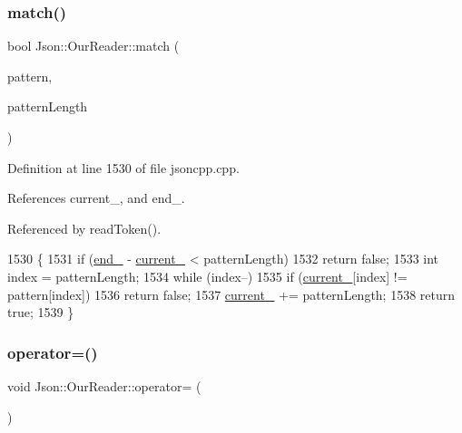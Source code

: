 \subsubsection{\texorpdfstring{match()}{match()}}
{\footnotesize\ttfamily bool Json\+::\+Our\+Reader\+::match (\begin{DoxyParamCaption}\item[{\hyperlink{class_json_1_1_our_reader_a1bdc7bbc52ba87cae6b19746f2ee0189}{Location}}]{pattern,  }\item[{int}]{pattern\+Length }\end{DoxyParamCaption})\hspace{0.3cm}{\ttfamily [private]}}



Definition at line 1530 of file jsoncpp.\+cpp.



References current\+\_\+, and end\+\_\+.



Referenced by read\+Token().


\begin{DoxyCode}
1530                                                          \{
1531   \textcolor{keywordflow}{if} (\hyperlink{class_json_1_1_our_reader_ab1f69b0260c27a0d2d65dc56e42c8f9d}{end\_} - \hyperlink{class_json_1_1_our_reader_a5211fbbba94be80a22dd2317c621efcc}{current\_} < patternLength)
1532     \textcolor{keywordflow}{return} \textcolor{keyword}{false};
1533   \textcolor{keywordtype}{int} index = patternLength;
1534   \textcolor{keywordflow}{while} (index--)
1535     \textcolor{keywordflow}{if} (\hyperlink{class_json_1_1_our_reader_a5211fbbba94be80a22dd2317c621efcc}{current\_}[index] != pattern[index])
1536       \textcolor{keywordflow}{return} \textcolor{keyword}{false};
1537   \hyperlink{class_json_1_1_our_reader_a5211fbbba94be80a22dd2317c621efcc}{current\_} += patternLength;
1538   \textcolor{keywordflow}{return} \textcolor{keyword}{true};
1539 \}
\end{DoxyCode}
\mbox{\label{class_json_1_1_our_reader_ad418de7c47bd3d0510888e22110b796e}} 
\subsubsection{\texorpdfstring{operator=()}{operator=()}}
{\footnotesize\ttfamily void Json\+::\+Our\+Reader\+::operator= (\begin{DoxyParamCaption}\item[{\hyperlink{class_json_1_1_our_reader}{Our\+Reader} const \&}]{ }\end{DoxyParamCaption})\hspace{0.3cm}{\ttfamily [private]}}

